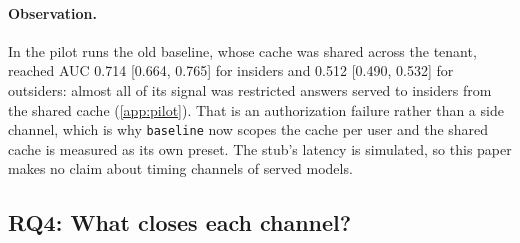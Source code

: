 \paragraph{Observation.}
 In the pilot runs the old baseline, whose cache was shared across the
tenant, reached AUC 0.714 [0.664, 0.765] for insiders and 0.512 [0.490, 0.532] for outsiders: almost
all of its signal was restricted answers served to insiders from the shared cache (\cref{app:pilot}).
That is an authorization failure rather than a side channel, which is why \texttt{baseline} now scopes
the cache per user and the shared cache is measured as its own preset. The stub's latency is
simulated, so this paper makes no claim about timing channels of served models.

\subsection{RQ4: What closes each channel?}
\label{sec:rq4}

